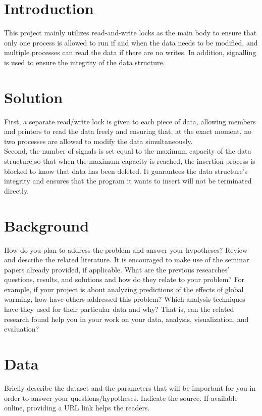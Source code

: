 \section{Introduction}
\label{chap:introduction}

This project mainly utilizes read-and-write locks as the main body to ensure that only one process is allowed to run
if and when the data needs to be modified, and multiple processes can read the data if there are no writes.
In addition, signalling is used to ensure the integrity of the data structure.

\section{Solution}
\label{sec:solution}
First, a separate read/write lock is given to each piece of data, allowing members and printers to read the data
freely and ensuring that, at the exact moment, no two processes are allowed to modify the data simultaneously. \\
Second, the number of signals is set equal to the maximum capacity of the data structure so that when the maximum
capacity is reached, the insertion process is blocked to know that data has been deleted. It guarantees the data
structure's integrity and ensures that the program it wants to insert will not be terminated directly.


\section{Background}
\label{chap:background}
How do you plan to address the problem and answer your hypotheses? Review and describe the related literature. It is encouraged to make use of the seminar papers already provided, if applicable. What are the previous researches’ questions, results, and solutions and how do they relate to your problem? For example, if your project is about analyzing predictions of the effects of global warming, how have others addressed this problem? Which analysis techniques have they used for their particular data and why? That is, can the related research found help you in your work on your data, analysis, visualization, and evaluation?


\section{Data}
\label{chap:data}
Briefly describe the dataset and the parameters that will be important for you in order to answer your questions/hypotheses. Indicate the source. If available online, providing a URL link helps the readers.

